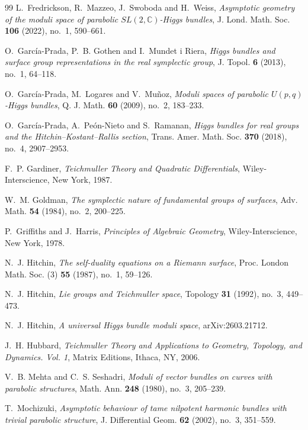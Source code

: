 \documentclass[11pt,reqno]{amsart}
\numberwithin{equation}{section}
\theoremstyle{plain}
\theoremstyle{definition}
\theoremstyle{remark}
\begin{document}
\begin{thebibliography}{99}
L.~Fredrickson, R.~Mazzeo, J.~Swoboda and H.~Weiss,
\emph{Asymptotic geometry of the moduli space of parabolic
\(SL(2,\mathbb C)\)-Higgs bundles},
J. Lond. Math. Soc. \textbf{106} (2022), no.~1, 590--661.

O.~Garc\'ia-Prada, P.~B. Gothen and I.~Mundet i Riera,
\emph{Higgs bundles and surface group representations in the real symplectic
group},
J. Topol. \textbf{6} (2013), no.~1, 64--118.

O.~Garc\'ia-Prada, M.~Logares and V.~Mu\~noz,
\emph{Moduli spaces of parabolic \(U(p,q)\)-Higgs bundles},
Q. J. Math. \textbf{60} (2009), no.~2, 183--233.

O.~Garc\'ia-Prada, A.~Pe\'on-Nieto and S.~Ramanan,
\emph{Higgs bundles for real groups and the Hitchin--Kostant--Rallis section},
Trans. Amer. Math. Soc. \textbf{370} (2018), no.~4, 2907--2953.


F.~P. Gardiner,
\emph{Teichmuller Theory and Quadratic Differentials},
Wiley-Interscience, New York, 1987.

W.~M. Goldman,
\emph{The symplectic nature of fundamental groups of surfaces},
Adv. Math. \textbf{54} (1984), no.~2, 200--225.

P.~Griffiths and J.~Harris,
\emph{Principles of Algebraic Geometry},
Wiley-Interscience, New York, 1978.

N.~J. Hitchin,
\emph{The self-duality equations on a Riemann surface},
Proc. London Math. Soc. (3) \textbf{55} (1987), no.~1, 59--126.

N.~J. Hitchin,
\emph{Lie groups and Teichmuller space},
Topology \textbf{31} (1992), no.~3, 449--473.

N.~J. Hitchin,
\emph{A universal Higgs bundle moduli space},
arXiv:2603.21712.

J.~H. Hubbard,
\emph{Teichmuller Theory and Applications to Geometry, Topology, and Dynamics.
Vol. 1},
Matrix Editions, Ithaca, NY, 2006.

V.~B. Mehta and C.~S. Seshadri,
\emph{Moduli of vector bundles on curves with parabolic structures},
Math. Ann. \textbf{248} (1980), no.~3, 205--239.

T.~Mochizuki,
\emph{Asymptotic behaviour of tame nilpotent harmonic bundles with trivial
parabolic structure},
J. Differential Geom. \textbf{62} (2002), no.~3, 351--559.


\end{thebibliography}
\end{document}

